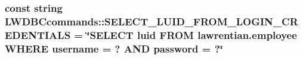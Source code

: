\subsubsection[{S\+E\+L\+E\+C\+T\+\_\+\+L\+U\+I\+D\+\_\+\+F\+R\+O\+M\+\_\+\+L\+O\+G\+I\+N\+\_\+\+C\+R\+E\+D\+E\+N\+T\+I\+A\+L\+S}]{\setlength{\rightskip}{0pt plus 5cm}const string L\+W\+D\+B\+Ccommands\+::\+S\+E\+L\+E\+C\+T\+\_\+\+L\+U\+I\+D\+\_\+\+F\+R\+O\+M\+\_\+\+L\+O\+G\+I\+N\+\_\+\+C\+R\+E\+D\+E\+N\+T\+I\+A\+L\+S = \char`\"{}S\+E\+L\+E\+C\+T luid F\+R\+O\+M lawrentian.\+employee W\+H\+E\+R\+E username = ? A\+N\+D password = ?\char`\"{}}\label{namespace_l_w_d_b_ccommands_af30578b8b16007ee496a1984487b9fc5}
